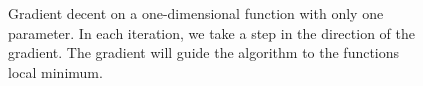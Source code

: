 %

\begin{figure}
\centering 
\resizebox{0.65\textwidth}{0.4\textwidth}{      

}
\caption{Gradient decent on a one-dimensional function with only one parameter.
In each iteration, we take a step in the direction of the gradient. The gradient will guide the algorithm to the functions local minimum.
}
\label{fig:gradientD}
\end{figure}
\noindent

